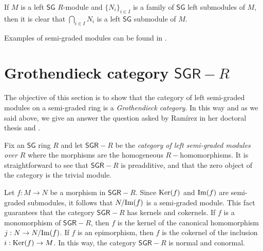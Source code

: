 \documentclass[reqno]{amsart}
\theoremstyle{definition}
\theoremstyle{remark}
\numberwithin{equation}{section}
\begin{document}
If $M$ is a left $\mathsf{SG}$ $R$-module and $\{N_i\}_{i\in I}$ is a family of $\mathsf{SG}$ left submodules of $M$, then it is clear that $\bigcap\limits_{i\in I} N_i$ is a left $\mathsf{SG}$ submodule of $M$. 


Examples of semi-graded modules can be found in \cite{Lezama2021, LouzariReyesSpringer2020, NinoRamirezReyes2020, Reyes2019}.


\section{Grothendieck category \texorpdfstring{$\mathsf{SGR}-R$}{Lg}}\label{SectionGrothendieckcategory}

The objective of this section is to show that the category of left semi-graded modules on a semi-graded ring is a {\em Grothendieck category}. In this way and as we said above, we give an answer the question asked by Ram\'irez in her doctoral thesis \cite[Section 3.4]{RamirezPhDThesis2023} and \cite[Section 4]{ChaconRamirezReyes2025}.

Fix an $\mathsf{SG}$ ring $R$ and let $\mathsf{SGR}-R$ be the {\em category of left semi-graded modules over} $R$ where the morphisms are the homogeneous $R-$homomorphisms. It is straightforward to see that $\mathsf{SGR}-R$ is preadditive, and that the zero object of the category is the trivial module. 

Let $f:M\rightarrow N$ be a morphism in $\mathsf{SGR}-R$. Since ${\rm Ker}(f)$ and ${\rm Im}(f)$ are semi-graded submodules, it follows that $N/{\rm Im}(f)$ is a semi-graded module. This fact guarantees that the category $\mathsf{SGR}-R$ has kernels and cokernels. If $f$ is a monomorphism of $\mathsf{SGR}-R$, then $f$ is the kernel of the canonical homomorphism $j:N\rightarrow N/{\rm Im}(f)$. If $f$ is an epimorphism, then $f$ is the cokernel of the inclusion $i:{\rm Ker}(f)\rightarrow M$. In this way, the category $\mathsf{SGR}-R$ is normal and conormal.
\end{document}
